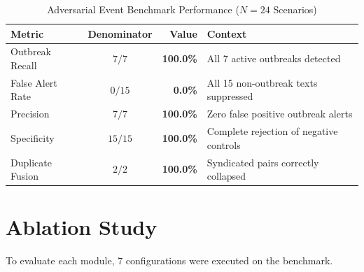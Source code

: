 \documentclass[conference]{IEEEtran}
\begin{document}
\begin{table}[htbp]
\caption{Adversarial Event Benchmark Performance ($N=24$ Scenarios)}
\label{tab:adversarial}
\begin{center}
\begin{tabular}{lcrl}
\toprule
\textbf{Metric} & \textbf{Denominator} & \textbf{Value} & \textbf{Context} \\
\midrule
Outbreak Recall & $7 / 7$ & \textbf{100.0\%} & All 7 active outbreaks detected \\
False Alert Rate & $0 / 15$ & \textbf{0.0\%} & All 15 non-outbreak texts suppressed \\
Precision & $7 / 7$ & \textbf{100.0\%} & Zero false positive outbreak alerts \\
Specificity & $15 / 15$ & \textbf{100.0\%} & Complete rejection of negative controls \\
Duplicate Fusion & $2 / 2$ & \textbf{100.0\%} & Syndicated pairs correctly collapsed \\
\bottomrule
\end{tabular}
\end{center}
\end{table}

\section{Ablation Study}
To evaluate each module, 7 configurations were executed on the benchmark.
\end{document}
